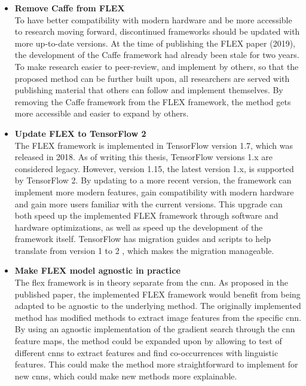             \begin{itemize}
                \item \textbf{Remove Caffe from FLEX\\} 
                To have better compatibility with modern hardware and be more accessible to research moving forward, discontinued frameworks should be updated with more up-to-date versions. At the time of publishing the FLEX paper (2019), the development of the Caffe framework had already been stale for two years. To make research easier to peer-review, and implement by others, so that the proposed method can be further built upon, all researchers are served with publishing material that others can follow and implement themselves. By removing the Caffe framework from the FLEX framework, the method gets more accessible and easier to expand by others.
                

                \item \textbf{Update FLEX to TensorFlow 2\\}
                The FLEX framework is implemented in TensorFlow version 1.7, which was released in 2018. As of writing this thesis, TensorFlow versions 1.x are considered legacy. However, version 1.15, the latest version 1.x, is supported by TensorFlow 2. By updating to a more recent version, the framework can implement more modern features, gain compatibility with modern hardware and gain more users familiar with the current versions. This upgrade can both speed up the implemented FLEX framework through software and hardware optimizations, as well as speed up the development of the framework itself. 
                TensorFlow has migration guides and scripts to help translate from version 1 to 2 \cite{MigrateTensorFlowTensorFlow}, which makes the migration manageable. 
    

                \item \textbf{Make FLEX model agnostic in practice\\}
                The \gls{flex} framework is in theory separate from the \gls{cnn}. As proposed in the published paper, the implemented FLEX framework would benefit from being adapted to be agnostic to the underlying method. The originally implemented method has modified methods to extract image features from the specific \gls{cnn}. By using an agnostic implementation of the gradient search through the \gls{cnn} feature maps, the method could be expanded upon by allowing to test of different \glspl{cnn} to extract features and find co-occurrences with linguistic features. This could make the method more straightforward to implement for new \glspl{cnn}, which could make new methods more explainable.

            \end{itemize}

